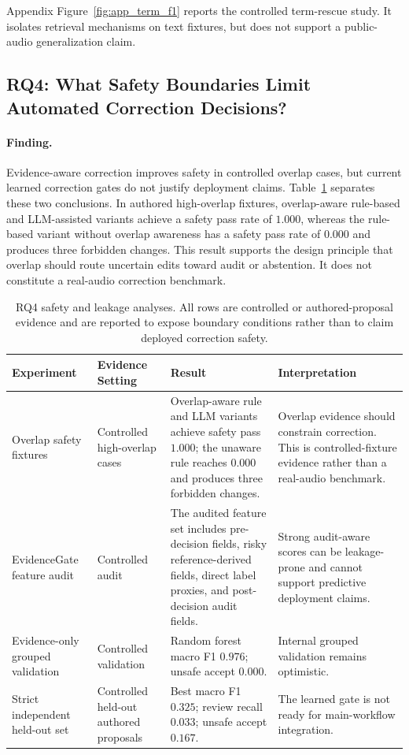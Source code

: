 \documentclass[10pt,twocolumn]{article}
\begin{document}
Appendix Figure~\ref{fig:app_term_f1} reports the controlled term-rescue study. It isolates retrieval mechanisms on text fixtures, but does not support a public-audio generalization claim.

\subsection{RQ4: What Safety Boundaries Limit Automated Correction Decisions?}
\label{sec:rq4}

\paragraph{Finding.}
Evidence-aware correction improves safety in controlled overlap cases, but current learned correction gates do not justify deployment claims. Table~\ref{tab:rq4} separates these two conclusions. In authored high-overlap fixtures, overlap-aware rule-based and LLM-assisted variants achieve a safety pass rate of \(1.000\), whereas the rule-based variant without overlap awareness has a safety pass rate of \(0.000\) and produces three forbidden changes. This result supports the design principle that overlap should route uncertain edits toward audit or abstention. It does not constitute a real-audio correction benchmark.

\begin{table}[t]
\centering
\footnotesize
\setlength{\tabcolsep}{4pt}
\renewcommand{\arraystretch}{1.15}
\begin{tabularx}{\textwidth}{p{}p{}X X}
\toprule
Experiment & Evidence Setting & Result & Interpretation \\
\midrule
Overlap safety fixtures &
Controlled high-overlap cases &
Overlap-aware rule and LLM variants achieve safety pass \(1.000\); the unaware rule reaches \(0.000\) and produces three forbidden changes. &
Overlap evidence should constrain correction. This is controlled-fixture evidence rather than a real-audio benchmark. \\

EvidenceGate feature audit &
Controlled audit &
The audited feature set includes pre-decision fields, risky reference-derived fields, direct label proxies, and post-decision audit fields. &
Strong audit-aware scores can be leakage-prone and cannot support predictive deployment claims. \\

Evidence-only grouped validation &
Controlled validation &
Random forest macro F1 \(0.976\); unsafe accept \(0.000\). &
Internal grouped validation remains optimistic. \\

Strict independent held-out set &
Controlled held-out authored proposals &
Best macro F1 \(0.325\); review recall \(0.033\); unsafe accept \(0.167\). &
The learned gate is not ready for main-workflow integration. \\
\bottomrule
\end{tabularx}
\caption{RQ4 safety and leakage analyses. All rows are controlled or authored-proposal evidence and are reported to expose boundary conditions rather than to claim deployed correction safety.}
\label{tab:rq4}
\end{table}
\end{document}
